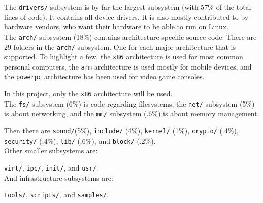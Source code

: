 \documentclass[a4paper,11pt]{report}
\newcommand{\figa}{
    \begin{figure}[!htpb]
    \centering
}
\newcommand{\figb}[2]{
    \caption{#1}
    \label{#2}
    \end{figure}
}
\begin{document}
The \texttt{drivers/} subsystem is by far the largest subsystem (with 57\% of 
the total lines of code). It contains all device drivers. It is also mostly 
contributed to by hardware vendors, who want their hardware to be able to run 
on Linux.
\\

The \texttt{arch/} subsystem (18\%) contains architecture specific source code. 
There are 29 folders in the \texttt{arch/} subsystem. One for each major 
architecture that is supported. To highlight a few, the \texttt{x86} 
architecture is used for most common personal computers, the \texttt{arm} 
architecture is used mostly for mobile devices, and the \texttt{powerpc} 
architecture has been used for video game consoles.

In this project, only the \texttt{x86} architecture will be used.
\\

The \texttt{fs/} subsystem (6\%) is code regarding filesystems, the 
\texttt{net/} subsystem (5\%) is about networking, and the \texttt{mm/} 
subsystem (.6\%) is about memory management.

Then there are \texttt{sound/}(5\%), \texttt{include/} (4\%), \texttt{kernel/} 
(1\%), \texttt{crypto/} (.4\%), \texttt{security/}  (.4\%), \texttt{lib/} 
(.6\%), and \texttt{block/} (.2\%).
\\

Other smaller subsystems are:

\texttt{virt/}, \texttt{ipc/}, \texttt{init/}, and \texttt{usr/}.
\\

And infrastructure subsystems are:

\texttt{tools/}, \texttt{scripts/}, and \texttt{samples/}.

\end{document}
